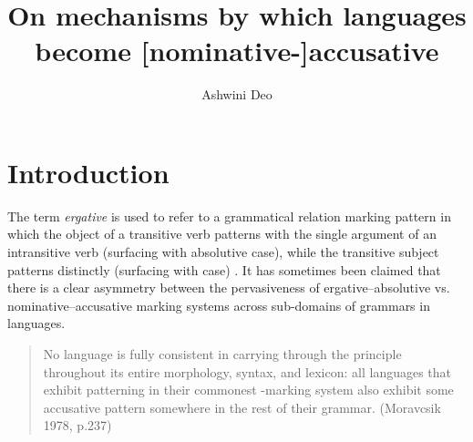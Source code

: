 \documentclass[output=paper,
modfonts
]{LSP/langsci}
\title{On mechanisms by which languages become [nominative-]accusative}
\author{%
Ashwini Deo\affiliation{The Ohio State University}}
\begin{document}
\maketitle


\section{Introduction}

The term \textit{ergative} is used to refer to a grammatical relation marking pattern in  which the object of
a transitive verb patterns with the single argument of an intransitive verb (surfacing with absolutive case), while the transitive
subject patterns distinctly (surfacing with  case) \citep{dixon79,dixon94,comrie78,plank79ed}.  It has sometimes been claimed  that there is a clear asymmetry between the pervasiveness of ergative--absolutive vs. nominative--accusative marking systems  across sub-domains of grammars  in languages. 

\begin{quote}
No  language is fully consistent in carrying through the  principle throughout
its entire morphology, syntax, and lexicon: all languages that exhibit  patterning in their
commonest -marking system also exhibit some accusative pattern somewhere in the rest of
their grammar. (Moravcsik 1978, p.237)
\end{quote}
\end{document}
